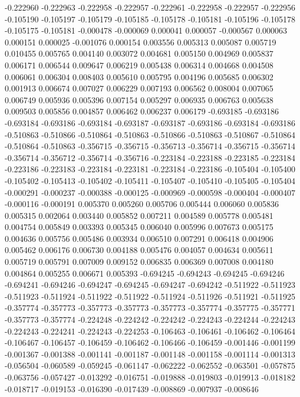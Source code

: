 -0.222960
-0.222963
-0.222958
-0.222957
-0.222961
-0.222958
-0.222957
-0.222956
-0.105190
-0.105197
-0.105179
-0.105185
-0.105178
-0.105181
-0.105196
-0.105178
-0.105175
-0.105181
-0.000478
-0.000069
0.000041
0.000057
-0.000567
0.000063
0.000151
0.000025
-0.001076
0.000154
0.003556
0.005313
0.005087
0.005719
0.010455
0.005765
0.004140
0.003072
0.004681
0.005150
0.004969
0.005837
0.006171
0.006544
0.009647
0.006219
0.005438
0.006314
0.004668
0.004508
0.006061
0.006304
0.008403
0.005610
0.005795
0.004196
0.005685
0.006302
0.001913
0.006674
0.007027
0.006229
0.007193
0.006562
0.008004
0.007065
0.006749
0.005936
0.005396
0.007154
0.005297
0.006935
0.006763
0.005638
0.009503
0.005856
0.004857
0.006462
0.006237
0.006179
-0.693185
-0.693186
-0.693184
-0.693186
-0.693184
-0.693187
-0.693187
-0.693186
-0.693184
-0.693186
-0.510863
-0.510866
-0.510864
-0.510863
-0.510866
-0.510863
-0.510867
-0.510864
-0.510864
-0.510863
-0.356715
-0.356715
-0.356713
-0.356714
-0.356715
-0.356714
-0.356714
-0.356712
-0.356714
-0.356716
-0.223184
-0.223188
-0.223185
-0.223184
-0.223186
-0.223183
-0.223184
-0.223181
-0.223184
-0.223186
-0.105404
-0.105400
-0.105402
-0.105413
-0.105402
-0.105411
-0.105407
-0.105410
-0.105405
-0.105404
-0.000291
-0.000237
-0.000388
-0.000125
-0.000969
-0.000598
-0.000404
-0.000407
-0.000116
-0.000191
0.005370
0.005260
0.005706
0.005444
0.006060
0.005836
0.005315
0.002064
0.003440
0.005852
0.007211
0.004589
0.005778
0.005481
0.004754
0.005849
0.003393
0.005345
0.006040
0.005996
0.007673
0.005175
0.004636
0.005756
0.005486
0.003934
0.006510
0.007291
0.006418
0.004906
0.005462
0.006176
0.006730
0.004188
0.005476
0.004057
0.004634
0.005611
0.005719
0.005791
0.007009
0.009152
0.006835
0.006369
0.007008
0.004180
0.004864
0.005255
0.006671
0.005393
-0.694245
-0.694243
-0.694245
-0.694246
-0.694241
-0.694246
-0.694247
-0.694245
-0.694247
-0.694242
-0.511922
-0.511923
-0.511923
-0.511924
-0.511922
-0.511922
-0.511924
-0.511926
-0.511921
-0.511925
-0.357774
-0.357773
-0.357773
-0.357773
-0.357773
-0.357774
-0.357775
-0.357771
-0.357773
-0.357774
-0.224248
-0.224242
-0.224242
-0.224243
-0.224244
-0.224243
-0.224243
-0.224241
-0.224243
-0.224253
-0.106463
-0.106461
-0.106462
-0.106464
-0.106467
-0.106457
-0.106459
-0.106462
-0.106466
-0.106459
-0.001446
-0.001199
-0.001367
-0.001388
-0.001141
-0.001187
-0.001148
-0.001158
-0.001114
-0.001313
-0.056504
-0.060589
-0.059245
-0.061147
-0.062222
-0.062552
-0.063501
-0.057875
-0.063756
-0.057427
-0.013292
-0.016751
-0.019888
-0.019803
-0.019913
-0.018182
-0.018717
-0.019153
-0.016390
-0.017439
-0.008869
-0.007937
-0.008646
